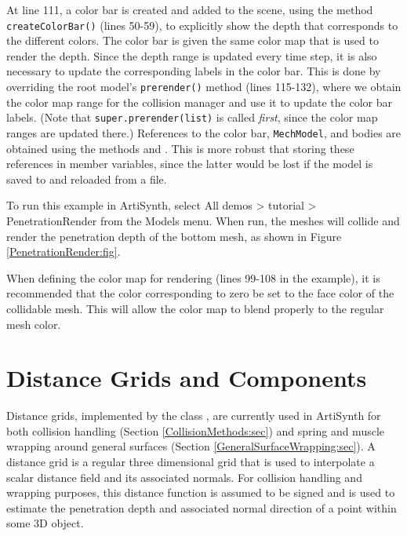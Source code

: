 At line 111, a color bar is created and added to the scene, using the
method {\tt createColorBar()} (lines 50-59), to explicitly show the
depth that corresponds to the different colors. The color bar is given
the same color map that is used to render the depth. Since the depth
range is updated every time step, it is also necessary to update the
corresponding labels in the color bar. This is done by overriding the
root model's {\tt prerender()} method (lines 115-132), where we obtain
the color map range for the collision manager and use it to update the
color bar labels. (Note that {\tt super.prerender(list)} is called {\it
first}, since the color map ranges are updated there.)
References to the color bar, {\tt MechModel}, and
bodies are obtained using the
 methods
 and
.
This is more robust that storing these references in  member
variables, since the latter would be lost if the model is saved to and
reloaded from a file.

To run this example in ArtiSynth, select {\sf All demos > tutorial >
PenetrationRender} from the {\sf Models} menu. When run, the meshes
will collide and render the penetration depth of the bottom mesh, 
as shown in Figure \ref{PenetrationRender:fig}.

\begin{sideblock}
When defining the color map for rendering (lines 99-108 in the
example), it is recommended that the color corresponding to zero be
set to the face color of the collidable mesh.  This will allow
the color map to blend properly to the regular mesh color.
\end{sideblock}

\section{Distance Grids and Components}
\label{DistanceGrids:sec}

Distance grids, implemented by the class
, are currently used in
ArtiSynth for both collision handling (Section
\ref{CollisionMethods:sec}) and spring and muscle wrapping around
general surfaces (Section \ref{GeneralSurfaceWrapping:sec}).  A
distance grid is a regular three dimensional grid that is used to
interpolate a scalar distance field and its associated normals.
For collision handling and wrapping purposes, this distance function
is assumed to be signed and is used to estimate the penetration depth
and associated normal direction of a point within some 3D object.

